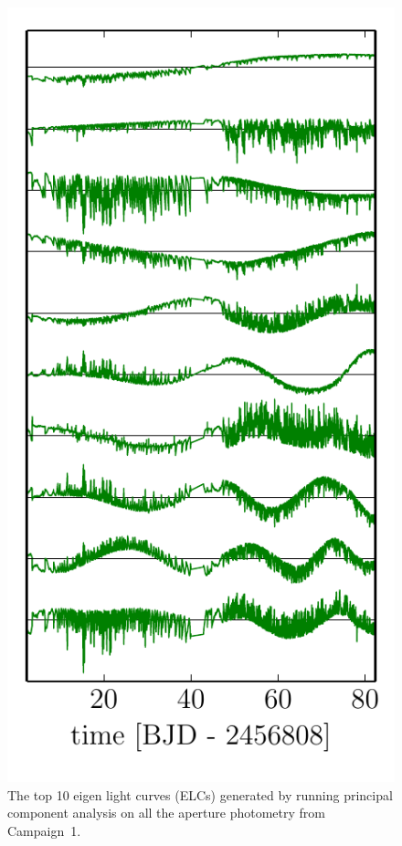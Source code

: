 \documentclass[12pt,preprint]{aastex}
\newcommand{\figlabel}[1]{\label{fig:#1}}
\begin{document}
\begin{figure}[p]
\begin{center}
\includegraphics{figures/pca.pdf}
\end{center}
\caption{%
The top 10 eigen light curves (ELCs) generated by running principal component
analysis on all the aperture photometry from Campaign~1.
\figlabel{pca}}
\end{figure}
\end{document}
